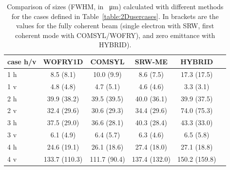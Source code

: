 \documentclass[preprint]{iucr}
\newcommand{\inred}[1]{{\color{red}#1}}
\newcommand{\whencolumns}[2]{#1}
\newcommand{\whencolumns}[2]{#2}
\begin{document}
\begin{table}[]
    \label{table:comparison}
    \caption{Comparison of sizes (FWHM, in \SI{}{\micro\meter}) calculated with different methods for the cases defined in Table~\ref{table:2Dusercases}.
    In brackets \inred{are} the values for the fully coherent beam (single electron with SRW, first coherent mode with COMSYL/WOFRY), and zero emittance with HYBRID). \vspace{5mm}
    }
    \centering
    \begin{tabular}
    {p{}|c|c|c|c|c}
         case h/v &
         WOFRY1D&
         COMSYL&
         SRW-ME&
         HYBRID \\
         \hline
1 h  & 8.5 (8.1)    & 10.0 (9.9)  & 8.6 (7.5)   & 17.3 (17.5) \\
1 v  & 4.8 (4.8)    & 4.7 (5.1)   & 4.6 (4.6)   & 3.3 (3.1) \\
\hline
2 h  & 39.9 (38.2)  & 39.5 (39.5) & 40.0 (36.1)  & 39.9 (37.5) \\
2 v  & 32.4 (29.6)  & 30.6 (29.3) & 34.4 (29.6)  & 74.0 (75.3) \\
\hline
3 h  & 37.5 (29.0)  & 36.6 (28.1) & 40.3 (28.4)  & 43.3 (33.0) \\
3 v  & 6.1 (4.9)   & 6.4 (5.7)   & 6.3 (4.6)    & 6.5 (5.8) \\
\hline
4 h  & 24.6 (19.1)  & 26.1 (18.6)  & 27.4 (18.0)   & 27.1 (18.8) \\
4 v  & 133.7 (110.3)& 111.7 (90.4) & 137.4 (132.0) & 150.2 (159.8) \\
    \end{tabular}
\end{table}



\newpage
\whencolumns{}{\onecolumn}
\end{document}
